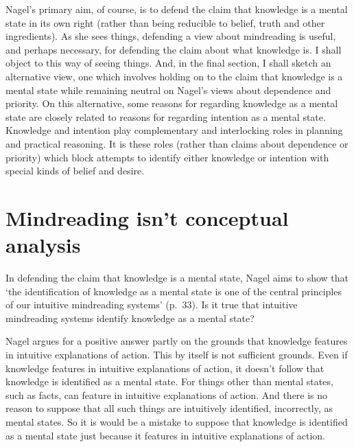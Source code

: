 \documentclass[11pt,a4paper]{extarticle}
\begin{document}
Nagel's primary aim, of course,
is to defend the claim that
knowledge is a mental state in its own right
(rather than being reducible to belief, truth and other ingredients).
As she sees things,
defending a view about mindreading
is useful, and perhaps necessary,
for defending the claim about what knowledge is.
I shall object to this way of seeing things.
And, in the final section, I shall sketch an alternative view,
one which involves holding on to the claim that knowledge is a mental state
while remaining neutral on Nagel's views about dependence and priority.
On this alternative,
some reasons for regarding knowledge as a mental state are 
closely related to
reasons for regarding intention as a mental state.
Knowledge and intention 
play complementary and interlocking roles in planning and practical reasoning.
It is these roles 
(rather than claims about dependence or priority)
which block attempts to identify either knowledge or intention with special kinds of belief and desire.




\section{Mindreading isn't conceptual analysis}
In defending the claim that knowledge is a mental state, Nagel aims to show that `the identification of knowledge as a mental state is one of the central principles of our intuitive mindreading systems' (p.\ 33).
Is it true that intuitive mindreading systems identify knowledge as a mental state?

Nagel argues for a positive answer
partly on the grounds that 
knowledge features in intuitive explanations of action.
This by itself is not sufficient grounds.
Even if knowledge features in intuitive explanations of action, 
it doesn't follow that
knowledge is identified as a mental state.
For things other than mental states, such as facts, can feature in intuitive explanations of action.
And there is no reason to suppose that all such things are intuitively identified, incorrectly, as mental states.
So it is would be a mistake to suppose that knowledge is identified as a mental state just because it features in intuitive explanations of action.
\end{document}
